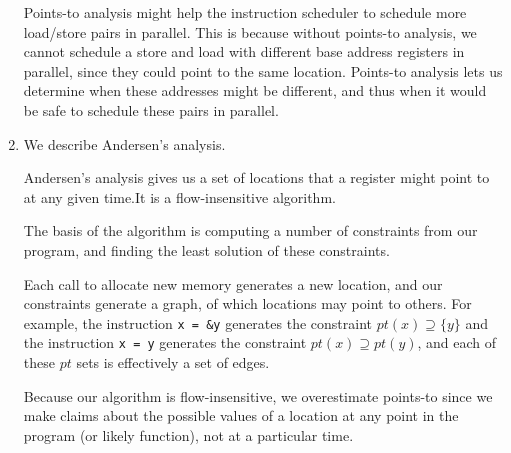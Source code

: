 \begin{enumerate}[label=(\alph*)]
    Points-to analysis might help the instruction scheduler to schedule more load/store pairs in parallel. This is because without points-to analysis, we cannot schedule a store and load with different base address registers in parallel, since they could point to the same location. Points-to analysis lets us determine when these addresses might be different, and thus when it would be safe to schedule these pairs in parallel.

  \item
    We describe Andersen's analysis.

    Andersen's analysis gives us a set of locations that a register might point to at any given time.It is a flow-insensitive algorithm.

    The basis of the algorithm is computing a number of constraints from our program, and finding the least solution of these constraints.

    Each call to allocate new memory generates a new location, and our constraints generate a graph, of which locations may point to others. For example, the instruction \texttt{x = \&y} generates the constraint $pt(x) \supseteq \{y\}$ and the instruction \texttt{x = y} generates the constraint $pt(x) \supseteq pt(y)$, and each of these $pt$ sets is effectively a set of edges.

    Because our algorithm is flow-insensitive, we overestimate points-to since we make claims about the possible values of a location at any point in the program (or likely function), not at a particular time.


        
\end{enumerate}

